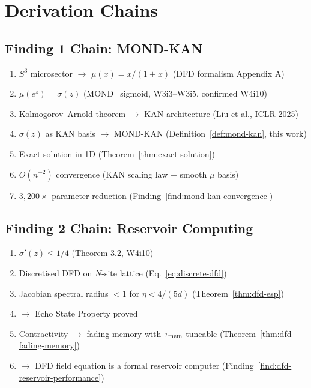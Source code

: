 \documentclass[11pt]{article}
\theoremstyle{definition}
\theoremstyle{remark}
\begin{document}
\section{Derivation Chains}
\label{sec:derivation-chains}

\subsection{Finding 1 Chain: MOND-KAN}

\begin{enumerate}[nosep]
\item $S^3$ microsector $\to$ $\mu(x) = x/(1+x)$ (DFD formalism Appendix A)
\item $\mu(e^z) = \sigma(z)$ (MOND=sigmoid, W3i3--W3i5, confirmed W4i10)
\item Kolmogorov--Arnold theorem $\to$ KAN architecture (Liu et al., ICLR 2025)
\item $\sigma(z)$ as KAN basis $\to$ MOND-KAN (Definition~\ref{def:mond-kan}, this work)
\item Exact solution in 1D (Theorem~\ref{thm:exact-solution})
\item $O(n^{-2})$ convergence (KAN scaling law + smooth $\mu$ basis)
\item $3{,}200\times$ parameter reduction (Finding~\ref{find:mond-kan-convergence})
\end{enumerate}

\subsection{Finding 2 Chain: Reservoir Computing}

\begin{enumerate}[nosep]
\item $\sigma'(z) \leq 1/4$ (Theorem 3.2, W4i10)
\item Discretised DFD on $N$-site lattice (Eq.~\ref{eq:discrete-dfd})
\item Jacobian spectral radius $< 1$ for $\eta < 4/(5d)$ (Theorem~\ref{thm:dfd-esp})
\item $\to$ Echo State Property proved
\item Contractivity $\to$ fading memory with $\tau_{\rm mem}$ tuneable (Theorem~\ref{thm:dfd-fading-memory})
\item $\to$ DFD field equation is a formal reservoir computer (Finding~\ref{find:dfd-reservoir-performance})
\end{enumerate}
\end{document}
